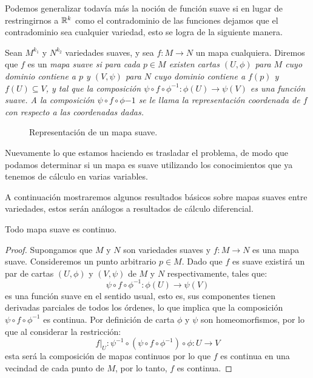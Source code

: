 Podemos generalizar todavía más la noción de función suave si en lugar de restringirnos a $\mathbb{R}^k$ como el contradominio de las funciones dejamos que el contradominio sea cualquier variedad, esto se logra de la siguiente manera.

\begin{definition}\label{Definición: Mapa Suave}
	Sean $M^{k_1}$ y $N^{k_2}$ variedades suaves, y sea $f: M \to N$ un mapa cualquiera. Diremos que $f$ es un \it{mapa suave} si para cada $p \in M$ existen cartas $(U,\phi)$ para $M$ cuyo dominio contiene a $p$ y $(V,\psi)$ para $N$ cuyo dominio contiene a $f(p)$ y $f(U) \subseteq V$, y tal que la composición $\psi \circ f \circ \phi^{-1}: \phi(U) \to \psi(V)$ es una función suave. A la composición $\psi \circ f \circ \phi{-1}$ se le llama la \it{representación coordenada de} $f$ con respecto a las coordenadas dadas.
\end{definition}

\begin{figure}[h]
	\centering
	\scalebox{.80}{}
	\caption{Representación de un mapa suave.}
\end{figure}

Nuevamente lo que estamos haciendo es trasladar el problema, de modo que podamos determinar si un mapa es suave utilizando los conocimientos que ya tenemos de cálculo en varias variables.

A continuación mostraremos algunos resultados básicos sobre mapas suaves entre variedades, estos serán análogos a resultados de cálculo diferencial.

\begin{theorem}
	Todo mapa suave es continuo.
\end{theorem}

\begin{proof}
	Supongamos que $M$ y $N$ son variedades suaves y $f: M \to N$ es una mapa suave. Consideremos un punto arbitrario $p \in M$. Dado que $f$ es suave existirá un par de cartas $(U,\phi)$ y $(V,\psi)$ de $M$ y $N$ respectivamente, tales que:
	\[
		\psi \circ f \circ \phi^{-1}: \phi(U) \to \psi(V)
	\]
	es una función suave en el sentido usual, esto es, sus componentes tienen derivadas parciales de todos los órdenes, lo que implica que la composición $\psi \circ f \circ \phi^{-1}$ es continua. Por definición de carta $\phi$ y $\psi$ son homeomorfismos, por lo que al considerar la restricción:
	\[
		f |_{U} : \psi^{-1} \circ (\psi \circ f \circ \phi^{-1}) \circ \phi : U \to V
	\]
	esta será la composición de mapas continuos por lo que $f$ es continua en una vecindad de cada punto de $M$, por lo tanto, $f$ es continua.
\end{proof}


